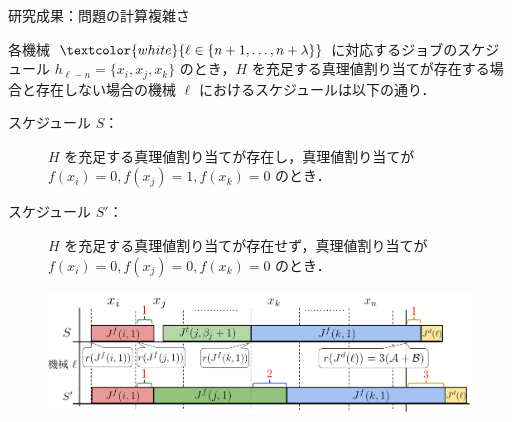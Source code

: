 \documentclass[dvipdfmx]{beamer}
\begin{document}
    \begin{frame}{研究成果：問題の計算複雑さ}
      \begin{block}{各機械 ${\textcolor{white}{\ell \in \{n + 1,\ldots,n + \lambda\}}}$ に対応するジョブのスケジュール}
        $h_{\ell - n} = \{x_i, x_j, x_k\}$ のとき，$H$ を充足する真理値割り当てが存在する場合と存在しない場合の機械 $\ell$ におけるスケジュールは以下の通り．
        \begin{description}
          \item[スケジュール $S$：]
          $H$ を充足する真理値割り当てが存在し，真理値割り当てが $f(x_i) = 0, f(x_j) = 1, f(x_k) = 0$ のとき．
          \item[スケジュール $S'$：]
          $H$ を充足する真理値割り当てが存在せず，真理値割り当てが $f(x_i) = 0, f(x_j) = 0, f(x_k) = 0$ のとき．
          \vspace{-7mm}
        \end{description}
        \begin{figure}[h]
          \centering
          \includegraphics[width=12cm]{figure/3SAT5.pdf}
        \end{figure}
      \end{block}
    \end{frame}
\end{document}
